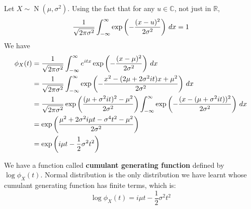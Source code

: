 \documentclass{huhtakm-template-book}
\DeclareMathOperator{\N}{N}
\begin{document}
    \begin{eg}
        Let $X\sim\N(\mu,\sigma^{2})$. Using the fact that for any $u\in\mathbb{C}$, not just in $\mathbb{R}$,
        \begin{equation*}
            \frac{1}{\sqrt{2\pi\sigma^{2}}}\int_{-\infty}^{\infty}\exp\left(-\frac{(x-u)^{2}}{2\sigma^{2}}\right)\,dx=1
        \end{equation*}
        We have
        \begin{align*}
            \phi_{X}(t)&=\frac{1}{\sqrt{2\pi\sigma^{2}}}\int_{-\infty}^{\infty} e^{itx}\exp\left(-\frac{(x-\mu)^{2}}{2\sigma^{2}}\right)\,dx\\
            &=\frac{1}{\sqrt{2\pi\sigma^{2}}}\int_{-\infty}^{\infty}\exp\left(-\frac{x^{2}-(2\mu+2\sigma^{2}it)x+\mu^{2}}{2\sigma^{2}}\right)\,dx\\
            &=\frac{1}{\sqrt{2\pi\sigma^{2}}}\exp\left(\frac{(\mu+\sigma^{2}it)^{2}-\mu^{2}}{2\sigma^{2}}\right)\int_{-\infty}^{\infty}\exp\left(-\frac{(x-(\mu+\sigma^{2}it))^{2}}{2\sigma^{2}}\right)\,dx\\
            &=\exp\left(\frac{\mu^{2}+2\sigma^{2}i\mu t-\sigma^{4}t^{2}-\mu^{2}}{2\sigma^{2}}\right)\\
            &=\exp\left(i\mu t-\frac{1}{2}\sigma^{2}t^{2}\right)
        \end{align*}
    \end{eg}
    \begin{rem}
        We have a function called \textbf{cumulant generating function} defined by $\log\phi_{X}(t)$. Normal distribution is the only distribution we have learnt whose cumulant generating function has finite terms, which is:
        \begin{equation*}
            \log\phi_{X}(t)=i\mu t-\frac{1}{2}\sigma^{2}t^{2}
        \end{equation*}
    \end{rem}
    \newpage
\end{document}
